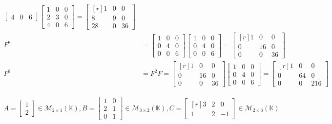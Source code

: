 \begin{align*}
\begin{bmatrix*}
		4 & 0 & 6
	\end{bmatrix*}
	\begin{bmatrix*}
		1 & 0 & 0\\
		2 & 3 & 0\\
		4 & 0 & 6
	\end{bmatrix*}
	=
	\begin{bmatrix*}[r]
		1  & 0 & 0\\
		8  & 9 & 0\\
		28 & 0 & 36
	\end{bmatrix*}
	\\
	F^2
	&=
	\begin{bmatrix*}
		1 & 0 & 0\\
		0 & 4 & 0\\
		0 & 0 & 6
	\end{bmatrix*}
	\begin{bmatrix*}
		1 & 0 & 0\\
		0 & 4 & 0\\
		0 & 0 & 6
	\end{bmatrix*}
	=
	\begin{bmatrix*}[r]
		1 & 0 & 0\\
		0 & 16 & 0\\
		0 & 0 & 36
	\end{bmatrix*}
	\\
	F^3
	&= F^2 F =
	\begin{bmatrix*}[r]
		1 & 0 & 0\\
		0 & 16 & 0\\
		0 & 0 & 36
	\end{bmatrix*}
	\begin{bmatrix*}
		1 & 0 & 0\\
		0 & 4 & 0\\
		0 & 0 & 6
	\end{bmatrix*}
	=
	\begin{bmatrix*}[r]
		1 & 0 & 0\\
		0 & 64 & 0\\
		0 & 0 & 216
	\end{bmatrix*}
\end{align*}


\begin{align*}
	A =
	\begin{bmatrix*}
		1\\
		2
	\end{bmatrix*} \in \mathcal{M}_{2 \times 1}(\mathbb{K}),
	B =
	\begin{bmatrix*}
		1 & 0\\
		2 & 1\\
		0 & 1
	\end{bmatrix*}\in \mathcal{M}_{3 \times 2}(\mathbb{K}),
	C =
	\begin{bmatrix*}[r]
		3 & 2 & 0\\
		1 & 2 & -1
	\end{bmatrix*}\in \mathcal{M}_{2 \times 3}(\mathbb{K})
\end{align*}

